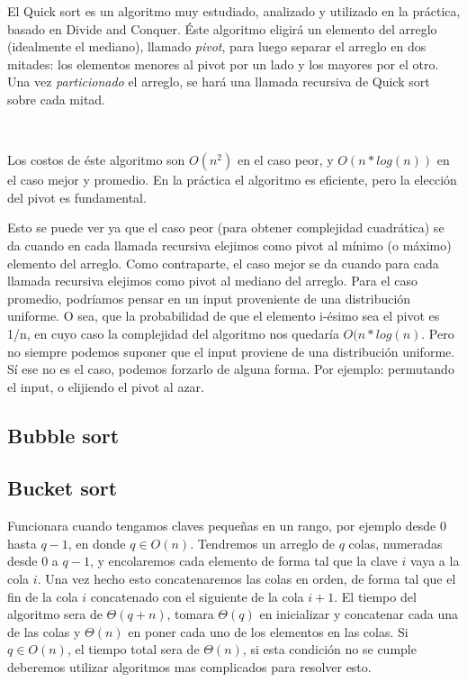 El Quick sort es un algoritmo muy estudiado, analizado y utilizado en la pr\'actica, basado en Divide and Conquer.
\'Este algoritmo eligir\'a un elemento del arreglo (idealmente el mediano), llamado \textit{pivot}, para luego separar el arreglo en dos mitades: los elementos menores al pivot por un lado y los mayores por el otro. Una vez \textit{particionado} el arreglo, se har\'a una llamada recursiva de Quick sort sobre cada mitad.

~

Los costos de \'este algoritmo son $O(n^2)$ en el caso peor, y $O(n*log(n))$ en el caso mejor y promedio. En la pr\'actica el algoritmo es eficiente, pero la elecci\'on del pivot es fundamental.

Esto se puede ver ya que el caso peor (para obtener complejidad cuadr\'atica) se da cuando en cada llamada recursiva elejimos como pivot al m\'inimo (o m\'aximo) elemento del arreglo.
Como contraparte, el caso mejor se da cuando para cada llamada recursiva elejimos como pivot al mediano del arreglo.
Para el caso promedio, podr\'iamos pensar en un input proveniente de una distribuci\'on uniforme. O sea, que la probabilidad de que el elemento i-\'esimo sea el pivot es 1/n, en cuyo caso la complejidad del algoritmo nos quedar\'ia $O(n*log(n)$.
Pero no siempre podemos suponer que el input proviene de una distribuci\'on uniforme. S\'i ese no es el caso, podemos forzarlo de alguna forma. Por ejemplo: permutando el input, o elijiendo el pivot al azar.

\subsection{Bubble sort}

\subsection{Bucket sort}

Funcionara cuando tengamos claves peque\~nas en un rango, por ejemplo desde $0$ hasta $q-1$, en donde $q \in O(n)$. Tendremos un arreglo de $q$ colas, numeradas desde $0$ a $q-1$, y encolaremos cada elemento de forma tal que la clave $i$ vaya a la cola $i$. Una vez hecho esto concatenaremos las colas en orden, de forma tal que el fin de la cola $i$ concatenado con el siguiente de la cola $i+1$. El tiempo del algoritmo sera de $\Theta(q+n)$, tomara $\Theta(q)$ en inicializar y concatenar cada una de las colas y $\Theta(n)$  en poner cada uno de los elementos en las colas. Si $q \in O(n)$, el tiempo total sera de $\Theta(n)$, si esta condici\'on no se cumple deberemos utilizar algoritmos mas complicados para resolver esto.

